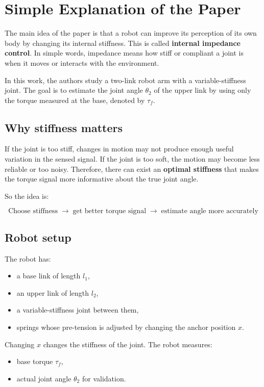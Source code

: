 \section*{Simple Explanation of the Paper}

The main idea of the paper is that a robot can improve its perception of its own body by changing its internal stiffness. This is called \textbf{internal impedance control}. In simple words, impedance means how stiff or compliant a joint is when it moves or interacts with the environment.

In this work, the authors study a two-link robot arm with a variable-stiffness joint. The goal is to estimate the joint angle \( \theta_2 \) of the upper link by using only the torque measured at the base, denoted by \( \tau_f \).

\subsection*{Why stiffness matters}

If the joint is too stiff, changes in motion may not produce enough useful variation in the sensed signal. If the joint is too soft, the motion may become less reliable or too noisy. Therefore, there can exist an \textbf{optimal stiffness} that makes the torque signal more informative about the true joint angle.

So the idea is:

\[
\text{Choose stiffness} \;\rightarrow\; \text{get better torque signal} \;\rightarrow\; \text{estimate angle more accurately}
\]

\subsection*{Robot setup}

The robot has:
\begin{itemize}
    \item a base link of length \( l_1 \),
    \item an upper link of length \( l_2 \),
    \item a variable-stiffness joint between them,
    \item springs whose pre-tension is adjusted by changing the anchor position \( x \).
\end{itemize}

Changing \( x \) changes the stiffness of the joint. The robot measures:
\begin{itemize}
    \item base torque \( \tau_f \),
    \item actual joint angle \( \theta_2 \) for validation.
\end{itemize}

